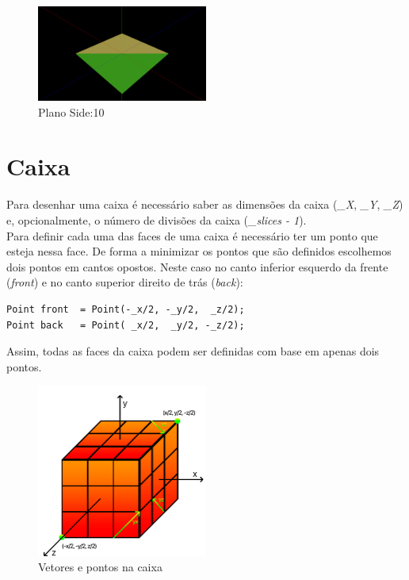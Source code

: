 \documentclass[a4paper]{report}
\begin{document}
\begin{figure}[H]
    \centering 
    \includegraphics[width=0.5\textwidth]{images/plane.png}  
    \caption{Plano Side:10}
    \label{fig:plane}
\end{figure}

\section{Caixa}
Para desenhar uma caixa é necessário saber as dimensões da caixa (\textit{\_X},
\textit{\_Y}, \textit{\_Z}) e, opcionalmente, o número de divisões da caixa
(\textit{\_slices - 1}).\\
Para definir cada uma das faces de uma caixa é necessário ter um ponto que
esteja nessa face. De forma a minimizar os pontos que são definidos escolhemos
dois pontos em cantos opostos. Neste caso no canto inferior esquerdo da frente
(\textit{front}) e no canto superior direito de trás (\textit{back}):\\
\begin{lstlisting}
Point front  = Point(-_x/2, -_y/2,  _z/2);
Point back   = Point( _x/2,  _y/2, -_z/2);
\end{lstlisting}
Assim, todas as faces da caixa podem ser definidas com base em apenas dois
pontos.\\
\begin{figure}[H]
    \centering 
    \includegraphics[width=0.5\textwidth]{images/cubo_vectors.png}  
    \caption{Vetores e pontos na caixa}
    \label{fig:box_vectors}
\end{figure}
\end{document}
